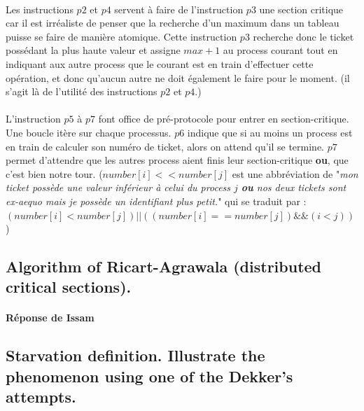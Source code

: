 \paragraph{}
Les instructions $p2$ et $p4$ servent à faire de l'instruction $p3$ une section critique car il est irréaliste de penser que la recherche d'un maximum dans un tableau puisse se faire de manière atomique. Cette instruction $p3$ recherche donc le ticket possédant la plus haute valeur et assigne $max+1$ au process courant tout en indiquant aux autre process que le courant est en train d'effectuer cette opération, et donc qu'aucun autre ne doit également le faire pour le moment. (il s'agit là de l'utilité des instructions $p2$ et $p4$.)

\paragraph{}
L'instruction $p5$ à $p7$ font office de pré-protocole pour entrer en section-critique. Une boucle itère sur chaque processus. $p6$ indique que si au moins un process est en train de calculer son numéro de ticket, alors on attend qu'il se termine. $p7$ permet d'attendre que les autres process aient finis leur section-critique \textbf{ou}, que c'est bien notre tour. ($number[i] << number[j]$ est une abbréviation de "\textit{mon ticket possède une valeur inférieur à celui du process $j$ \textbf{ou} nos deux tickets sont ex-aequo mais je possède un identifiant plus petit.}" qui se traduit par : $(number[i] < number[j]) || ((number[i] == number[j]) \&\& (i<j))$)





\subsection{Algorithm of Ricart-Agrawala (distributed critical sections).}
\paragraph{Réponse de Issam}







\subsection{Starvation definition. Illustrate the phenomenon using one of the Dekker’s attempts.}

